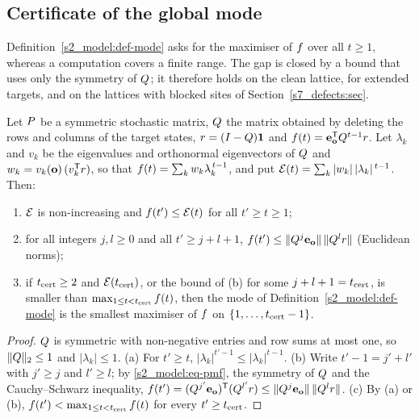\subsection{Certificate of the global mode}\label{s3_methods:ssec-unimodal}

Definition~\ref{s2_model:def-mode} asks for the maximiser of $f$ over all $t\ge1$, whereas a computation covers a
finite range. The gap is closed by a bound that uses only the symmetry of $Q$; it therefore holds on the clean
lattice, for extended targets, and on the lattices with blocked sites of Section~\ref{s7_defects:sec}.

\begin{proposition}\label{s3_methods:prop-certificate}
Let $P$ be a symmetric stochastic matrix, $Q$ the matrix obtained by deleting the rows and columns of the
target states, $r=(I-Q)\mathbf{1}$ and $f(t)=\mathbf{e}_{\mathbf{o}}^{\mathsf{T}}Q^{t-1}r$. Let $\lambda_k$ and $v_k$ be the eigenvalues
and orthonormal eigenvectors of $Q$ and $w_k=v_k(\mathbf{o})\,(v_k^{\mathsf{T}}r)$, so that $f(t)=\sum_k w_k\lambda_k^{\,t-1}$,
and put $\mathcal{E}(t)=\sum_k|w_k|\,|\lambda_k|^{\,t-1}$. Then:
\begin{enumerate}
\item[(a)] $\mathcal{E}$ is non-increasing and $f(t')\le\mathcal{E}(t)$ for all $t'\ge t\ge1$;
\item[(b)] for all integers $j,l\ge0$ and all $t'\ge j+l+1$,
$f(t')\le\|Q^{j}\mathbf{e}_{\mathbf{o}}\|\,\|Q^{l}r\|$ (Euclidean norms);
\item[(c)] if $t_{\mathrm{cert}}\ge2$ and $\mathcal{E}(t_{\mathrm{cert}})$, or the bound of \textup{(b)} for some
$j+l+1=t_{\mathrm{cert}}$, is smaller than $\max_{1\le t<t_{\mathrm{cert}}}f(t)$, then the mode of
Definition~\ref{s2_model:def-mode} is the smallest maximiser of $f$ on $\{1,\dots,t_{\mathrm{cert}}-1\}$.
\end{enumerate}
\end{proposition}

\begin{proof}
$Q$ is symmetric with non-negative entries and row sums at most one, so $\|Q\|_2\le1$ and $|\lambda_k|\le1$.
(a) For $t'\ge t$, $|\lambda_k|^{t'-1}\le|\lambda_k|^{t-1}$. (b) Write $t'-1=j'+l'$ with $j'\ge j$ and $l'\ge l$; by
\eqref{s2_model:eq-pmf}, the symmetry of $Q$ and the Cauchy--Schwarz inequality,
$f(t')=(Q^{j'}\mathbf{e}_{\mathbf{o}})^{\mathsf{T}}(Q^{l'}r)\le\|Q^{j}\mathbf{e}_{\mathbf{o}}\|\,\|Q^{l}r\|$. (c) By (a) or (b),
$f(t')<\max_{1\le t<t_{\mathrm{cert}}}f(t)$ for every $t'\ge t_{\mathrm{cert}}$.
\end{proof}

